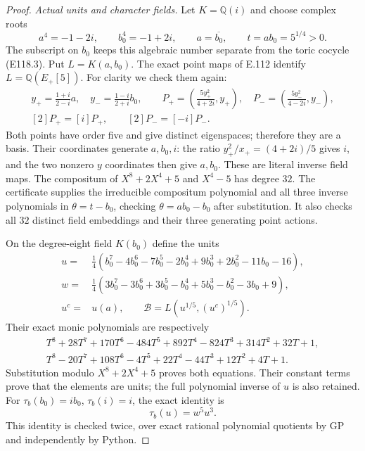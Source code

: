 \begin{proof}
\emph{Actual units and character fields.}
Let $K=\mathbb Q(i)$ and choose complex roots
\[
 a^4=-1-2i,\qquad b_0^4=-1+2i,\qquad
 a=\overline{b_0},\qquad t=ab_0=5^{1/4}>0.
 \tag{E118.5}
\]
The subscript on $b_0$ keeps this algebraic number separate
from the toric cocycle (E118.3). Put
$L=K(a,b_0)$. The exact point maps of E.112 identify
$L=\mathbb Q(E_+[5])$. For clarity we check them again:
\[
 \begin{gathered}
 y_+=\frac{1+i}{2-i}a,\quad
 y_-=\frac{1-i}{2+i}b_0,\qquad
 P_+=\left(\frac{5y_+^2}{4+2i},y_+\right),\quad
 P_-=\left(\frac{5y_-^2}{4-2i},y_-\right),\\
 [2]P_+=[i]P_+,\qquad [2]P_-=[-i]P_-.
 \end{gathered}
 \tag{E118.6}
\]
Both points have order five and give distinct eigenspaces;
therefore they are a basis. Their coordinates generate $a,b_0,i$:
the ratio $y_+^2/x_+=(4+2i)/5$ gives $i$, and the two
nonzero $y$ coordinates then give $a,b_0$. These are literal
inverse field maps. The compositum of
$X^8+2X^4+5$ and $X^4-5$ has degree $32$.
The certificate supplies the irreducible compositum polynomial
and all three inverse polynomials in $\theta=t-b_0$,
checking $\theta=ab_0-b_0$ after substitution.
It also checks all $32$ distinct field embeddings and
their three generating point actions.

On the degree-eight field $K(b_0)$ define the units
\[
 \begin{aligned}
 u={}&\tfrac14(b_0^7-4b_0^6-7b_0^5-2b_0^4
                  +9b_0^3+2b_0^2-11b_0-16),\\
 w={}&\tfrac14(3b_0^7-3b_0^6+3b_0^5-b_0^4
                  +5b_0^3-b_0^2-3b_0+9),\\
 u^c={}&u(a),\qquad
 \mathcal B=L(u^{1/5},(u^c)^{1/5}).
 \end{aligned}
 \tag{E118.7}
\]
Their exact monic polynomials are respectively
\[
 \begin{aligned}
 T^8+28T^7+170T^6-484T^5+892T^4
                -824T^3+314T^2+32T+1,\\
 T^8-20T^7+108T^6-4T^5+22T^4
                -44T^3+12T^2+4T+1.
 \end{aligned}
\]
Substitution modulo $X^8+2X^4+5$ proves both equations.
Their constant terms prove that the elements are units;
the full polynomial inverse of $u$ is also retained.
For $\tau_b(b_0)=ib_0$, $\tau_b(i)=i$, the exact identity is
\[
                       \tau_b(u)=w^5u^3.
 \tag{E118.8}
\]
This identity is checked twice, over exact rational
polynomial quotients by GP and independently by Python.


\end{proof}
